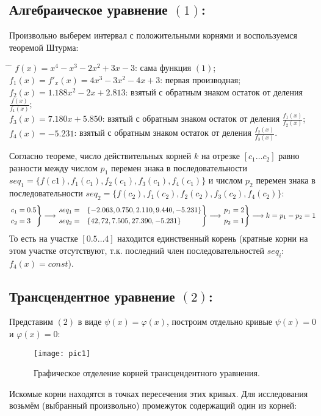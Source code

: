 \subsection{Алгебраическое уравнение $(1)$:}
Произвольно выберем интервал с положительными корнями и воспользуемся теоремой Штурма:
\begin{tabbing}
    \hspace*{4cm}\= \hspace*{6cm} \= \kill
    \> $f(x) = x^4 - x^3 - 2x^2 + 3x - 3$:\> сама функция $(1)$;\\
    \> $f_1(x) = f'_x(x) = 4x^3 - 3x^2 - 4x + 3$:\> первая производная;\\
    \> $f_2(x) = 1.188x^2-2x+2.813$:\> взятый с обратным знаком остаток от деления $\frac{f(x)}{f_1(x)}$;\\
    \> $f_3(x) = 7.180x+5.850$:\> взятый с обратным знаком остаток от деления $\frac{f_1(x)}{f_2(x)}$;\\
    \> $f_4(x) = -5.231$:\> взятый с обратным знаком остаток от деления $\frac{f_2(x)}{f_3(x)}$.
\end{tabbing}
Согласно теореме, число действительных корней $k$ на отрезке $[c_1 \ldots c_2]$ равно разности между числом $p_1$ перемен знака в последовательности $seq_1=\{f(c1), f_1(c_1), f_2(c_1), f_3(c_1), f_4(c_1)\}$ и числом
$p_2$ перемен знака в последовательности $seq_2=\{f(c_2), f_1(c_2), f_2(c_2), f_3(c_2), f_4(c_2)\}$:
\begin{equation}
    \begin{rcases}
        c_1 =0.5 \\
        c_2 =3
    \end{rcases}
    \longrightarrow
    \begin{rcases}
        seq_1=&\{-2.063, 0.750, 2.110, 9.440, -5.231\} \\
        seq_2=&\{42, 72, 7.505, 27.390, -5.231\}
    \end{rcases}
    \longrightarrow
    \begin{rcases}
        p_1=2 \\
        p_2=1
    \end{rcases}
    \longrightarrow
    k=p_1-p_2=1
\end{equation}
То есть на участке $[0.5 \ldots 4]$ находится единственный корень (кратные корни на этом участке отсутствуют, т.к. последний член последовательностей $seq_i$:  $f_4(x)=const$).

\clearpage
\subsection{ Трансцендентное уравнение $(2)$:}
Представим $(2)$ в виде $\psi(x)=\varphi(x)$, построим отдельно кривые $\psi(x)=0$ и $\varphi(x)=0$:
\begin{figure}[H]
    \centering
    \caption{Графическое отделение корней трансцендентного уравнения.}
    \label{fig:pic1}
    \texttt{[image: pic1]}
\end{figure}
Искомые корни находятся в точках пересечения этих кривых. Для исследования возьмём (выбранный произвольно) промежуток содержащий один из корней:
\begin{align}
    [0.6 \ldots 1.5]
\end{align}

